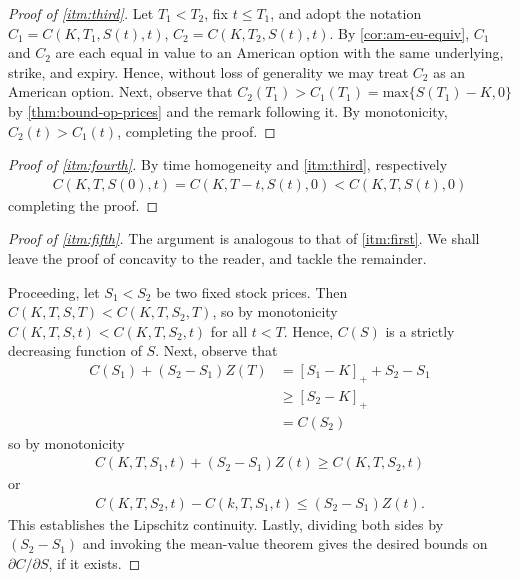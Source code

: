 \documentclass[12pt]{article}
\newcommand{\p}{\partial}
\theoremstyle{plain}
\theoremstyle{definition}
\theoremstyle{remark}
\numberwithin{equation}{section}  %
\begin{document}
\begin{proof}[Proof of \cref{itm:third}]
	Let $T_{1} < T_{2}$, fix $t \le T_{1}$, and
	adopt the notation
	$C_{1} = C(K, T_{1}, S(t), t)$, $C_{2} = C(K, T_{2}, S(t), t)$.  
	By \cref{cor:am-eu-equiv}, $C_{1}$ and $C_{2}$ are each equal in value to
	an American option with the same underlying, strike, and expiry. Hence,
	without loss of generality we
	may treat $C_{2}$ as an American option. Next, observe
	that $C_{2}(T_{1}) > C_{1}(T_{1}) = \text{max}\{S(T_{1})-K, 0\}$
	by \cref{thm:bound-op-prices} and the remark following it.
	By monotonicity, $C_{2}(t) >  
	C_{1}(t)$, completing the proof. 
\end{proof}
\begin{proof}[Proof of \cref{itm:fourth}]
	By time homogeneity and \cref{itm:third}, respectively
	\begin{equation*}
		\begin{split}
			C(K, T, S(0), t) = C(K, T-t, S(t), 0) < C(K, T, S(t), 0)
		\end{split}
	\end{equation*}
	completing the proof.
\end{proof}
\begin{proof}[Proof of \cref{itm:fifth}]
	The argument is analogous to that of \cref{itm:first}. We shall leave
	the proof of concavity to the reader, and tackle the remainder.

	Proceeding,
	let $S_{1} < S_{2}$ be two fixed stock prices. Then $C(K, T, S, T) <
	C(K, T, S_{2}, T)$, so by monotonicity
	$C(K, T, S, t) < C(K, T, S_{2}, t)$ for all $t < T$. Hence,
	$C(S)$ is a strictly decreasing function of $S$. Next, observe that
	\begin{equation*}
		\begin{split}
			C(S_{1}) + (S_{2} - S_{1})Z(T) 
			& = {[S_{1} - K]}_{+} + S_{2} - S_{1}
			\\
			& \ge {[S_{2} - K]}_{+}
			\\
			& = C(S_{2})
		\end{split}
	\end{equation*}
	so by monotonicity
	\begin{equation*}
		\begin{split}
			C(K, T, S_{1}, t) + (S_{2} - S_{1})Z(t) \ge C(K, T, S_{2}, t)
		\end{split}
	\end{equation*}
	or
	\begin{equation*}
		\begin{split}
			C(K, T, S_{2}, t) - C(k, T, S_{1}, t) \le (S_{2} - S_{1})Z(t).
		\end{split}
	\end{equation*}
	This establishes the Lipschitz continuity. Lastly, dividing both sides by
	$(S_{2} - S_{1})$ and invoking the mean-value theorem
	gives the desired bounds on $\p C/ \p S$, if it exists.
\end{proof}
\end{document}
